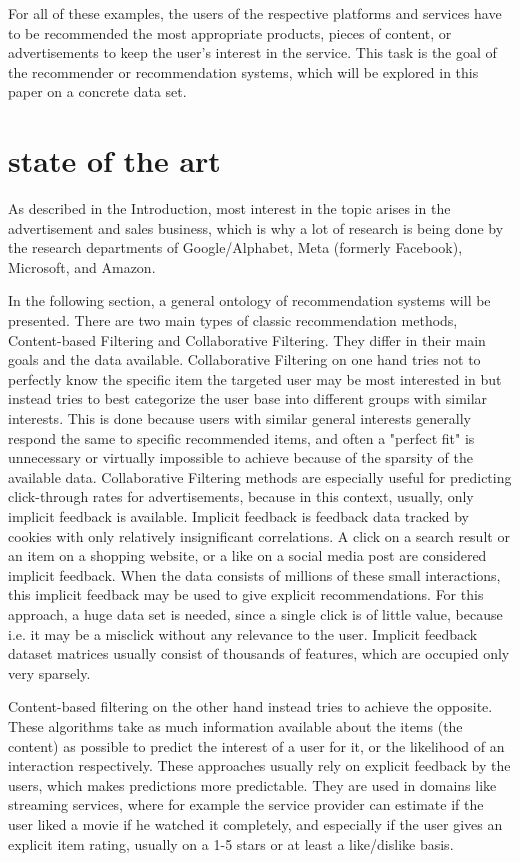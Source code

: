 \documentclass[10pt,final,journal,a4paper,oneside,twocolumn]{IEEEtran}
\begin{document}
For all of these examples, the users of the respective platforms and services have to be recommended the most appropriate products, pieces of content, or advertisements to keep the user's interest in the service. This task is the goal of the recommender or recommendation systems, which will be explored in this paper on a concrete data set.

\section{state of the art}\label{sec:stateoftheart}
As described in the Introduction, most interest in the topic arises in the advertisement and sales business, which is why a lot of research is being done by the research departments of Google/Alphabet, Meta (formerly Facebook), Microsoft, and Amazon.

In the following section, a general ontology of recommendation systems will be presented.
There are two main types of classic recommendation methods, Content-based Filtering and Collaborative Filtering. They differ in their main goals and the data available. 
Collaborative Filtering on one hand tries not to perfectly know the specific item the targeted user may be most interested in but instead tries to best categorize the user base into different groups with similar interests. This is done because users with similar general interests generally respond the same to specific recommended items, and often a "perfect fit" is unnecessary or virtually impossible to achieve because of the sparsity of the available data.
Collaborative Filtering methods are especially useful for predicting click-through rates for advertisements, because in this context, usually, only implicit feedback is available. Implicit feedback is feedback data tracked by cookies with only relatively insignificant correlations. A click on a search result or an item on a shopping website, or a like on a social media post are considered implicit feedback.  When the data consists of millions of these small interactions, this implicit feedback may be used to give explicit recommendations. For this approach, a huge data set is needed, since a single click is of little value, because i.e. it may be a misclick without any relevance to the user. Implicit feedback dataset matrices usually consist of thousands of features, which are occupied only very sparsely.


Content-based filtering on the other hand instead tries to achieve the opposite. These algorithms take as much information available about the items (the content) as possible to predict the interest of a user for it, or the likelihood of an interaction respectively. These approaches usually rely on explicit feedback by the users, which makes predictions more predictable. They are used in domains like streaming services, where for example the service provider can estimate if the user liked a movie if he watched it completely, and especially if the user gives an explicit item rating, usually on a 1-5 stars or at least a like/dislike basis.
\end{document}
